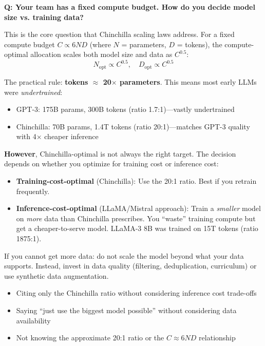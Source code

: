 \begin{interviewq}
\textbf{Q: Your team has a fixed compute budget. How do you decide model size vs. training data?}

 \quad {} \quad \badgefreq{\freqhigh}

\stronganswer
This is the core question that Chinchilla scaling laws address. For a fixed compute budget $C \propto 6ND$ (where $N$ = parameters, $D$ = tokens), the compute-optimal allocation scales both model size and data as $C^{0.5}$:
\[N_{\text{opt}} \propto C^{0.5}, \quad D_{\text{opt}} \propto C^{0.5}\]

The practical rule: \textbf{tokens $\approx$ 20$\times$ parameters}. This means most early LLMs were \textit{undertrained}:
\begin{itemize}
    \item GPT-3: 175B params, 300B tokens (ratio 1.7:1)---vastly undertrained
    \item Chinchilla: 70B params, 1.4T tokens (ratio 20:1)---matches GPT-3 quality with 4$\times$ cheaper inference
\end{itemize}

\textbf{However}, Chinchilla-optimal is not always the right target. The decision depends on whether you optimize for training cost or inference cost:
\begin{itemize}
    \item \textbf{Training-cost-optimal} (Chinchilla): Use the 20:1 ratio. Best if you retrain frequently.
    \item \textbf{Inference-cost-optimal} (LLaMA/Mistral approach): Train a \textit{smaller} model on \textit{more} data than Chinchilla prescribes. You ``waste'' training compute but get a cheaper-to-serve model. LLaMA-3 8B was trained on 15T tokens (ratio 1875:1).
\end{itemize}

If you cannot get more data: do not scale the model beyond what your data supports. Instead, invest in data quality (filtering, deduplication, curriculum) or use synthetic data augmentation.

\redflags
\begin{itemize}
    \item Citing only the Chinchilla ratio without considering inference cost trade-offs
    \item Saying ``just use the biggest model possible'' without considering data availability
    \item Not knowing the approximate 20:1 ratio or the $C \approx 6ND$ relationship
\end{itemize}


\end{interviewq}
